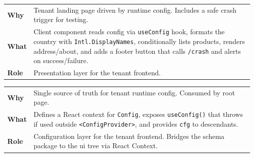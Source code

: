 \documentclass[11pt, a4paper, oneside, listof=totoc]{scrartcl}
\makeatletter
\newcommand{\codesummary}[3]{%
    \vspace{0.4\baselineskip}%
    \noindent\begin{tabularx}{\linewidth}{@{}>{\bfseries}l X@{}}
    Why  & #1\\
    What & #2\\
    Role & #3\\
    \end{tabularx}%
    \vspace{0.2\baselineskip}%
}
\makeatother
\begin{document}
                \codesummary
                    {Tenant landing page driven by runtime config. Includes a safe crash trigger for testing.}
                    {Client component reads config via \texttt{useConfig} hook, formats the country with \texttt{Intl.DisplayNames}, conditionally lists products, renders address/about, and adds a footer button that calls \texttt{/crash} and alerts on success/failure.}
                    {Presentation layer for the tenant frontend.}

                \codesummary
                    {Single source of truth for tenant runtime config. Consumed by root page.}
                    {Defines a React context for \texttt{Config}, exposes \texttt{useConfig()} that throws if used outside \texttt{<ConfigProvider>}, and provides \texttt{cfg} to descendants.}
                    {Configuration layer for the tenant frontend. Bridges the schema package to the \gls{ui} tree via React Context.}
            
\end{document}
